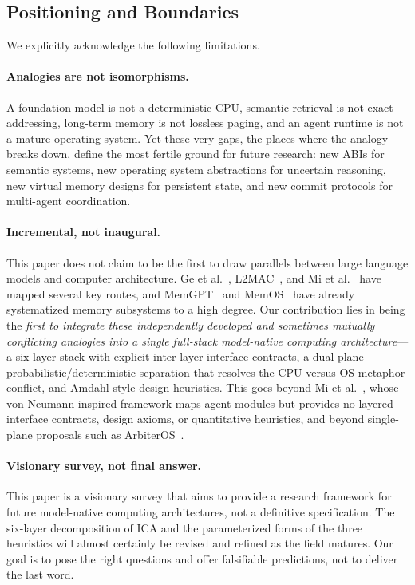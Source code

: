 \subsection{Positioning and Boundaries}

We explicitly acknowledge the following limitations.

\paragraph{Analogies are not isomorphisms.}
A foundation model is not a deterministic CPU, semantic retrieval is not exact addressing, long-term memory is not lossless paging, and an agent runtime is not a mature operating system. Yet these very gaps, the places where the analogy breaks down, define the most fertile ground for future research: new ABIs for semantic systems, new operating system abstractions for uncertain reasoning, new virtual memory designs for persistent state, and new commit protocols for multi-agent coordination.

\paragraph{Incremental, not inaugural.}
This paper does not claim to be the first to draw parallels between large language models and computer architecture. Ge et al.~\cite{ge2023llmos}, L2MAC~\cite{holt2024l2mac}, and Mi et al.~\cite{mi2025llmagentscomputersystems} have mapped several key routes, and MemGPT~\cite{memgpt2023} and MemOS~\cite{memos2025} have already systematized memory subsystems to a high degree. Our contribution lies in being the \emph{first to integrate these independently developed and sometimes mutually conflicting analogies into a single full-stack model-native computing architecture}---a six-layer stack with explicit inter-layer interface contracts, a dual-plane probabilistic/deterministic separation that resolves the CPU-versus-OS metaphor conflict, and Amdahl-style design heuristics. This goes beyond Mi et al.~\cite{mi2025llmagentscomputersystems}, whose von-Neumann-inspired framework maps agent modules but provides no layered interface contracts, design axioms, or quantitative heuristics, and beyond single-plane proposals such as ArbiterOS~\cite{arbiteros2025}.

\paragraph{Visionary survey, not final answer.}
This paper is a visionary survey that aims to provide a research framework for future model-native computing architectures, not a definitive specification. The six-layer decomposition of ICA and the parameterized forms of the three heuristics will almost certainly be revised and refined as the field matures. Our goal is to pose the right questions and offer falsifiable predictions, not to deliver the last word.

